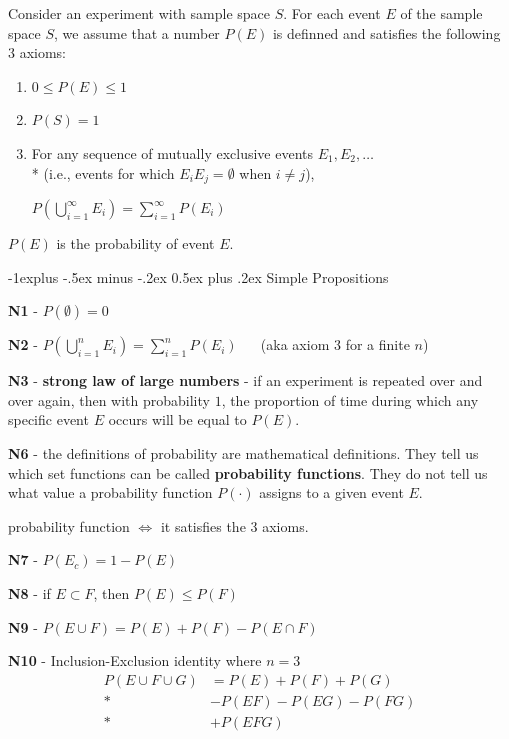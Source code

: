\documentclass[10pt, landscape]{article}
\makeatletter
\renewcommand{\subsection}{\@startsection{subsection}{2}{0mm}%
  {-1explus -.5ex minus -.2ex}%
  {0.5ex plus .2ex}%
{\normalfont\normalsize\bfseries}}
\makeatother
\begin{document}
\begin{multicols*}{3}
  Consider an experiment with sample space $S$. 
  For each event $E$ of the sample space $S$, we assume that a number $P(E)$ is definned and satisfies the following 3 axioms:
  \begin{enumerate}
    \item $0 \leq P(E) \leq 1$ 
    \item $P(S) = 1$
    \item For any sequence of mutually exclusive events $E_1, E_2, \dots$ 
      \\* (i.e., events for which $E_iE_j = \emptyset$ when  $i \neq j$),
      \begin{tightcenter}
        $P(\bigcup\limits^\infty_{i=1} E_i) = \sum\limits^\infty_{i=1} P(E_i)$ 
      \end{tightcenter}
  \end{enumerate}
  $P(E)$ is the probability of event $E$.

  \subsection{Simple Propositions}

  \textbf{N1} - $P(\emptyset) = 0$

  \textbf{N2} - $P(\bigcup\limits^n_{i=1} E_i) = \sum\limits^n_{i=1} P(E_i)$ 
  $\quad$ (aka axiom 3 for a finite $n$)

  \textbf{N3} - \textbf{strong law of large numbers} - if an experiment is repeated over and over again, then with probability $1$, 
  the proportion of time during which any specific event $E$ occurs will be equal to $P(E)$.

  \textbf{N6} - the definitions of probability are mathematical definitions. 
  They tell us which set functions can be called \textbf{probability functions}. 
  They do not tell us what value a probability function $P(\cdot)$ assigns to a given event $E$.

  \begin{tightcenter}
    probability function $\iff$ it satisfies the 3 axioms.
  \end{tightcenter}

  \textbf{N7} - $P(E_c) = 1-P(E)$

  \textbf{N8} - if $E \subset F$, then $P(E) \leq P(F)$

  \textbf{N9} - $P(E \cup F) = P(E) + P(F) - P(E \cap F)$

  \textbf{N10} - Inclusion-Exclusion identity where $n=3$
  \begin{align*}
    P(E \cup F \cup G) &= P(E) + P(F) + P(G) \\*
                       &- P(EF) - P(EG) - P(FG) \\*
                       &+ P(EFG)
  \end{align*}


\end{multicols*}
\end{document}
